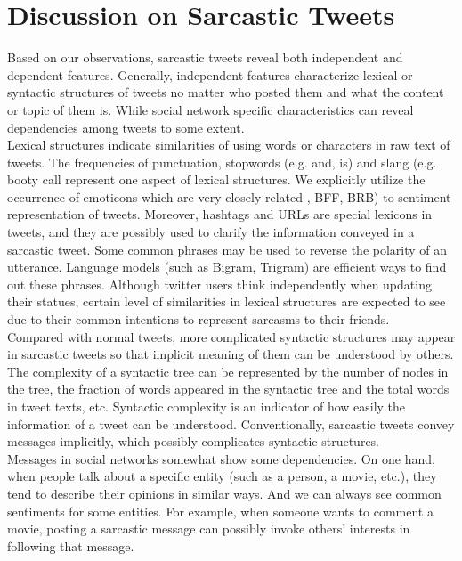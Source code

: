 \section{Discussion on Sarcastic Tweets}
\label{sec:dataset}

Based on our observations, sarcastic tweets reveal both independent and dependent features. Generally, independent features characterize lexical or syntactic structures of tweets no matter who posted them and what the content or topic of them is. While social network specific characteristics can reveal dependencies among tweets to some extent.\\

Lexical structures indicate similarities of using words or characters in raw text of tweets. The frequencies of punctuation, stopwords (e.g. and, is)  and slang (e.g. booty call represent one aspect of lexical structures. We explicitly utilize the occurrence of emoticons which are very closely related , BFF, BRB) to sentiment representation of tweets. Moreover, hashtags and URLs are special lexicons in tweets, and they are possibly used to clarify the information conveyed in a sarcastic tweet. Some common phrases may be used to reverse the polarity of an utterance. Language models (such as Bigram, Trigram) are efficient ways to find out these phrases. Although twitter users think independently when updating their statues, certain level of similarities in lexical structures are expected to see due to their common intentions to represent sarcasms to their friends.\\

Compared with normal tweets, more complicated syntactic structures may appear in sarcastic tweets so that implicit meaning of them can be understood by others. The complexity of a syntactic tree can be represented by the number of nodes in the tree, the fraction of words appeared in the syntactic tree and the total words in tweet texts, etc. Syntactic complexity is an indicator of how easily the information of a tweet can be understood. Conventionally, sarcastic tweets convey messages implicitly, which possibly complicates syntactic structures.\\

Messages in social networks somewhat show some dependencies. On one hand, when people talk about a specific entity (such as a person, a movie, etc.), they tend to describe their opinions in similar ways. And we can always see common sentiments for some entities. For example, when someone wants to comment a movie, posting a sarcastic message can possibly invoke others' interests in following that message.\\

